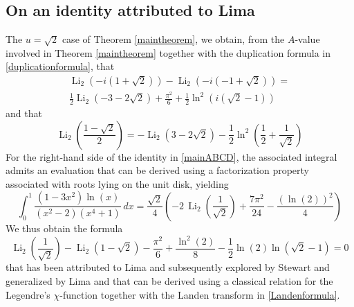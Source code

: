 \documentclass[12pt]{article}
\begin{document}
\subsection{On an identity attributed to Lima}
 The $u = 
 \sqrt{2}$ case of Theorem \ref{maintheorem}, we obtain, from the $A$-value involved in Theorem \ref{maintheorem} together 
 with the duplication formula in \eqref{duplicationformula}, that 
\begin{multline*}
 \operatorname{Li}_2\left(-i\left(1 + \sqrt{2}\right)\right) - \operatorname{Li}_2\left(-i\left(-1 + \sqrt{2}\right)\right) = \\ 
 \frac{1}{2} \operatorname{Li}_2\left(-3 - 2 \sqrt{2}\right) + \frac{\pi^2}{6} + \frac{1}{2} \ln^2\left(i\left(\sqrt{2} - 1\right)\right) 
\end{multline*}
 and that 
\begin{equation*}
\operatorname{Li}_2\left(\frac{1 - \sqrt{2}}{2} 
 \right) = -\operatorname{Li}_2\left(3 - 2 \sqrt{2}\right) - \frac{1}{2} \ln^2\left(\frac{1}{2} + \frac{1}{\sqrt{2}}\right)
\end{equation*}
 For the right-hand side of the identity in \eqref{mainABCD}, the associated integral admits an evaluation that can be derived using a 
 factorization property associated with roots lying on the unit disk, yielding 
\begin{equation*}
 \int_0^1 \frac{(1 - 3x^2) \ln(x)}{(x^2 - 2)(x^4 + 1)} \, dx = 
 \frac{\sqrt{2}}{4} \left( -2 \, \operatorname{Li}_2\left( \frac{1}{\sqrt{2}} \right) + \frac{7\pi^2}{24} - \frac{(\ln(2))^2}{4} \right)
\end{equation*}
 We thus obtain the formula 
\begin{equation}\label{attributedLima}
 \operatorname{Li}_2\left( \frac{1}{\sqrt{2}} \right) - \operatorname{Li}_2\left( 1 - \sqrt{2} \right) - 
 \frac{\pi^2}{6} + \frac{\ln^2(2)}{8} - \frac{1}{2} \ln(2) \ln\left( \sqrt{2} - 1 \right) = 0 
\end{equation}
 that has been attributed to Lima \cite{Lima2012} and subsequently explored by Stewart \cite{Stewart2022} and generalized by Lima 
 \cite{Lima2024} and that can be derived using a classical relation for the Legendre's $\chi$-function together with the Landen 
 transform in \eqref{Landenformula}. 
\end{document}
